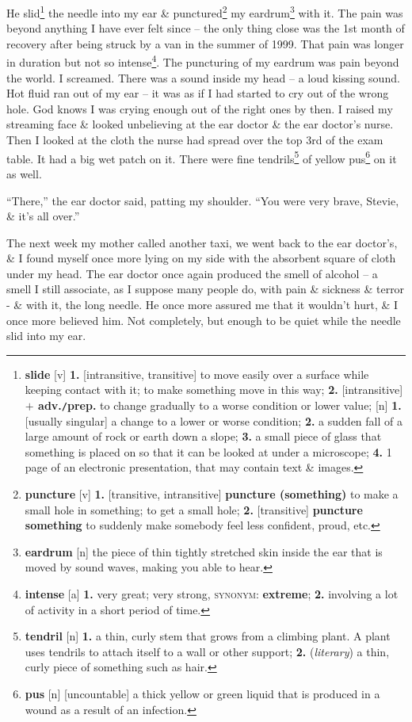 \documentclass[oneside]{book}
\numberwithin{equation}{section}
\begin{document}
He slid\footnote{\textbf{slide} [v] \textbf{1.} [intransitive, transitive] to move easily over a surface while keeping contact with it; to make something move in this way; \textbf{2.} [intransitive] \textbf{$+$ adv.\texttt{/}prep.} to change gradually to a worse condition or lower value; [n] \textbf{1.} [usually singular] a change to a lower or worse condition; \textbf{2.} a sudden fall of a large amount of rock or earth down a slope; \textbf{3.} a small piece of glass that something is placed on so that it can be looked at under a microscope; \textbf{4.} 1 page of an electronic presentation, that may contain text \& images.} the needle into my ear \& punctured\footnote{\textbf{puncture} [v] \textbf{1.} [transitive, intransitive] \textbf{puncture (something)} to make a small hole in something; to get a small hole; \textbf{2.} [transitive] \textbf{puncture something} to suddenly make somebody feel less confident, proud, etc.} my eardrum\footnote{\textbf{eardrum} [n] the piece of thin tightly stretched skin inside the ear that is moved by sound waves, making you able to hear.} with it. The pain was beyond anything I have ever felt since -- the only thing close was the 1st month of recovery after being struck by a van in the summer of 1999. That pain was longer in duration but not so intense\footnote{\textbf{intense} [a] \textbf{1.} very great; very strong, \textsc{synonym}: \textbf{extreme}; \textbf{2.} involving a lot of activity in a short period of time.}. The puncturing of my eardrum was pain beyond the world. I screamed. There was a sound inside my head -- a loud kissing sound. Hot fluid ran out of my ear -- it was as if I had started to cry out of the wrong hole. God knows I was crying enough out of the right ones by then. I raised my streaming face \& looked unbelieving at the ear doctor \& the ear doctor's nurse. Then I looked at the cloth the nurse had spread over the top 3rd of the exam table. It had a big wet patch on it. There were fine tendrils\footnote{\textbf{tendril} [n] \textbf{1.} a thin, curly stem that grows from a climbing plant. A plant uses tendrils to attach itself to a wall or other support; \textbf{2.} (\textit{literary}) a thin, curly piece of something such as hair.} of yellow pus\footnote{\textbf{pus} [n] [uncountable] a thick yellow or green liquid that is produced in a wound as a result of an infection.} on it as well.

``There,'' the ear doctor said, patting my shoulder. ``You were very brave, Stevie, \& it's all over.''

The next week my mother called another taxi, we went back to the ear doctor's, \& I found myself once more lying on my side with the absorbent square of cloth under my head. The ear doctor once again produced the smell of alcohol -- a smell I still associate, as I suppose many people do, with pain \& sickness \& terror - \& with it, the long needle. He once more assured me that it wouldn't hurt, \& I once more believed him. Not completely, but enough to be quiet while the needle slid into my ear.
\end{document}

